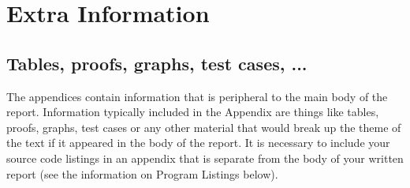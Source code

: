 \chapter{Extra Information} \label{Appendix}
\section{Tables, proofs, graphs, test cases, ...}
The appendices contain information that is peripheral to the main body of the report. Information typically included in the Appendix are things like tables, proofs, graphs, test cases or any other material that would break up the theme of the text if it appeared in the body of the report. It is necessary to include your source code listings in an appendix that is separate from the body of your written report (see the information on Program Listings below).

